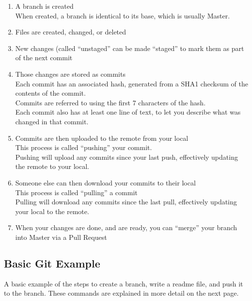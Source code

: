 \documentclass{article}
\begin{document}
\begin{enumerate}
	\item A branch is created
		\\When created, a branch is identical to its base, which is usually Master.
	\item Files are created, changed, or deleted
	\item New changes (called ``unstaged'' can be made ``staged'' to mark them as part of the next commit
	\item Those changes are stored as commits
		\\Each commit has an associated hash, generated from a SHA1 checksum of the contents of the commit.
		\\Commits are referred to using the first 7 characters of the hash.
		\\Each commit also has at least one line of text, to let you describe what was changed in that commit.
	\item Commits are then uploaded to the remote from your local
		\\This process is called ``pushing'' your commit.
		\\Pushing will upload any commits since your last push, effectively updating the remote to your local.
	\item Someone else can then download your commits to their local
		\\This process is called ``pulling'' a commit
		\\Pulling will download any commits since the last pull, effectively updating your local to the remote.
	\item When your changes are done, and are ready, you can ``merge'' your branch into Master via a Pull Request
\end{enumerate}

\subsection{Basic Git Example}

A basic example of the steps to create a branch, write a readme file, and push it to the branch.
These commands are explained in more detail on the next page.

\
\end{document}

